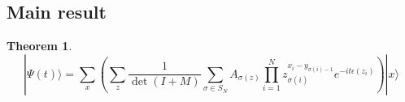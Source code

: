 \documentclass[11pt]{article}
\numberwithin{equation}{section}
\theoremstyle{plain}
\theoremstyle{plain}
\newtheorem{theorem}{Theorem}[section]
\theoremstyle{definition}
\begin{document}
\subsection{Main result}

\begin{theorem}
    \begin{equation}
    | \Psi (t) \rangle = \sum_{x} \left(\sum_{z} \frac{1}{\det(I + M)} \sum_{\sigma \in S_N} A_{\sigma(z)} \prod_{i=1}^{N} z_{\sigma(i)}^{x_i -y_{\sigma(i)-1}} e^{-it \epsilon(z_i)}\right) | x \rangle
    \end{equation}
\end{theorem}










    
\end{document}
